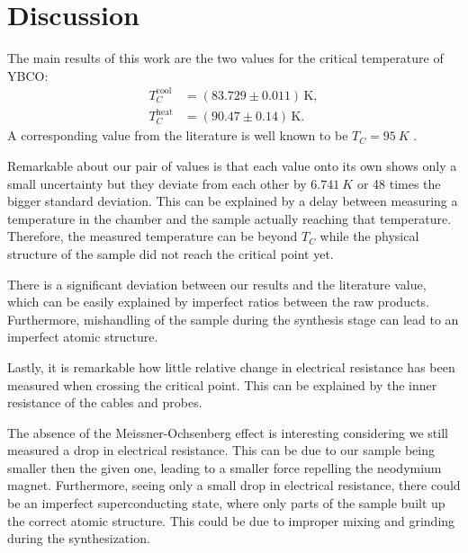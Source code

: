 \section{Discussion}
\label{sec:discussion}
The main results of this work are the two values for the critical temperature of YBCO:
\begin{align}
  T_C^\text{cool} &= (83.729 \pm 0.011) \, \text{K}, \\
  T_C^\text{heat} &= (90.47 \pm 0.14) \, \text{K}.
\end{align}
A corresponding value from the literature is well known to be $T_C = \SI{95}{K}$ \cite{19971173}.

Remarkable about our pair of values is that each value onto its own shows only a small uncertainty
but they deviate from each other by $\SI{6.741}{K}$ or 48 times the bigger standard deviation. This can
be explained by a delay between measuring a temperature in the chamber and the sample actually
reaching that temperature. Therefore, the measured temperature can be beyond $T_C$ while the
physical structure of the sample did not reach the critical point yet.

There is a significant deviation between our results and the literature value, which can be easily
explained by imperfect ratios between the raw products. Furthermore, mishandling of the sample
during the synthesis stage can lead to an imperfect atomic structure. 

Lastly, it is remarkable how little relative change in electrical resistance has been measured when
crossing the critical point. This can be explained by the inner resistance of the cables and probes.

The absence of the Meissner-Ochsenberg effect is interesting considering we still measured a drop in
electrical resistance. This can be due to our sample being smaller then the given one, leading to
a smaller force repelling the neodymium magnet. Furthermore, seeing only a small drop in electrical
resistance, there could be an imperfect superconducting state, where only parts of the sample built
up the correct atomic structure. This could be due to improper mixing and grinding during the
synthesization.

